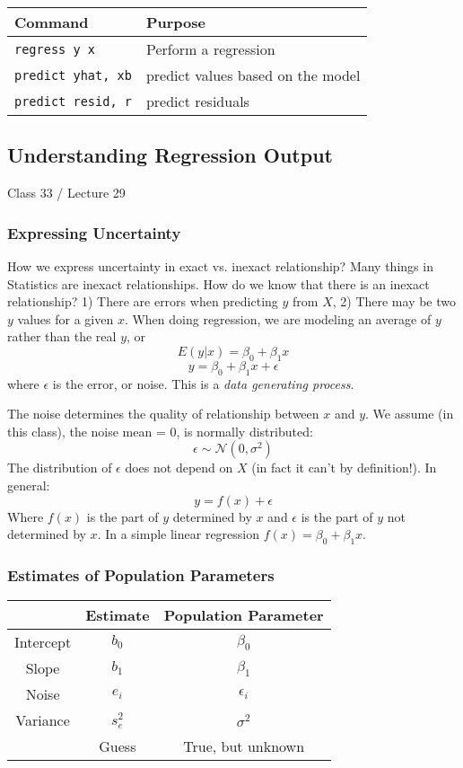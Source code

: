 \documentclass[11pt, oneside]{article}   	%
\begin{document}
\begin{tabular}{l p{ } }
Command & Purpose \\
\hline
\texttt{regress y x} & Perform a regression \\

\texttt{predict yhat, xb} & predict values based on the model \\

\texttt{predict resid, r} & predict residuals \\

\end{tabular}


\subsection{Understanding Regression Output}

Class 33 / Lecture 29
\subsubsection{Expressing Uncertainty}

How we express uncertainty in exact vs. inexact relationship? Many things in Statistics are inexact relationships. How do we know that there is an inexact relationship? 1) There are errors when predicting $y$ from $X$, 2) There may be two $y$ values for a given $x$. When doing regression, we are modeling an average of $y$ rather than the real $y$, or 
\[
E(y|x) = \beta_0 + \beta_1 x
\]
\[
y = \beta_0 + \beta_1 x + \epsilon
\]
where $\epsilon$ is the error, or noise. This is a \textit{data generating process}. 

The noise determines the quality of relationship between $x$ and $y$. We assume (in this class), the noise mean = 0, is normally distributed:
\[
\epsilon \sim \mathcal{N}(0,\sigma^2)
\]
The distribution of $\epsilon$ does not depend on $X$ (in fact it can't by definition!). In general:
\[
y = f(x) + \epsilon
\]
Where $f(x)$ is the part of $y$ determined by $x$ and $\epsilon$ is the part of $y$ not determined by $x$. In a simple linear regression $f(x) = \beta_0 + \beta_1 x$.

\subsubsection{Estimates of Population Parameters}
\begin{tabular}{| c | c | c| }
\hline
 & Estimate &  Population  Parameter \\
 \hline
 Intercept & $b_0$ & $\beta_0$ \\
 Slope & $b_1$ & $\beta_1$ \\
 Noise & $e_i$ & $\epsilon_i$ \\
 Variance & $s_e^2$ & $\sigma^2$ \\
\hline
& Guess & True, but unknown \\
\hline
\end{tabular}
\end{document}
